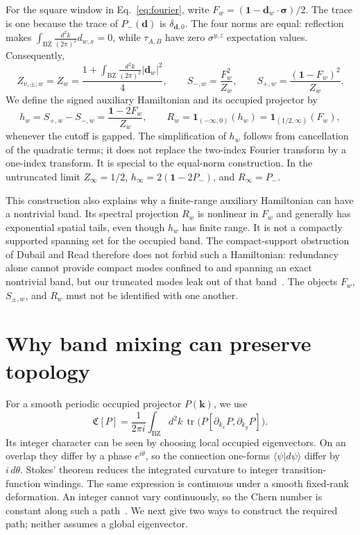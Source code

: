 \documentclass[aps,prb,onecolumn,nofootinbib,superscriptaddress]{revtex4-2}
\newcommand{\id}{\mathbf{1}}
\newcommand{\tr}{\operatorname{tr}}
\newcommand{\Ch}{\mathfrak C}
\newcommand{\bk}{\boldsymbol k}
\newcommand{\bd}{\boldsymbol d}
\newcommand{\intk}{\int_{\mathrm{BZ}}\frac{d^2k}{(2\pi)^2}}
\begin{document}
For the square window in Eq.~\eqref{eq:fourier}, write
$F_w=(\id-\boldsymbol d_w\cdot\boldsymbol\sigma)/2$.
The trace is one because the trace of $P_-(\bd)$ is $\delta_{\bd,0}$.
The four norms are equal: reflection makes $\intk d_{w,x}=0$, while
$\tau_{A,B}$ have zero $\sigma^{y,z}$ expectation values. Consequently,
\begin{equation}
 Z_{\nu,\pm;w}=Z_w=\frac{1+\intk|\boldsymbol d_w|^2}{4},\qquad
 S_{-,w}=\frac{F_w^2}{Z_w},\qquad
 S_{+,w}=\frac{(\id-F_w)^2}{Z_w}.
 \label{eq:symmetric-frame}
\end{equation}
We define the signed auxiliary Hamiltonian and its occupied projector by
\begin{equation}
 h_w=S_{+,w}-S_{-,w}=\frac{\id-2F_w}{Z_w},\qquad
 R_w=\mathbf{1}_{(-\infty,0)}(h_w)=\mathbf{1}_{(1/2,\infty)}(F_w),
 \label{eq:hw}
\end{equation}
whenever the cutoff is gapped. The simplification of $h_w$ follows from
cancellation of the quadratic terms; it does not replace the two-index
Fourier transform by a one-index transform. It is special to the equal-norm
construction. In the untruncated limit $Z_\infty=1/2$, $h_\infty=2(\id-2P_-)$,
and $R_\infty=P_-$.

This construction also explains why a finite-range auxiliary Hamiltonian can
have a nontrivial band. Its spectral projection $R_w$ is nonlinear in $F_w$
and generally has exponential spatial tails, even though $h_w$ has finite
range. It is not a compactly supported spanning set for the occupied band.
The compact-support obstruction of Dubail and Read therefore does not forbid
such a Hamiltonian: redundancy alone cannot provide compact modes confined
to and spanning an exact nontrivial band, but our truncated modes leak out
of that band~\cite{DubailRead2015}. The objects $F_w$, $S_{\pm,w}$, and $R_w$
must not be identified with one another.

\section{Why band mixing can preserve topology}
\label{sec:stability}

For a smooth periodic occupied projector $P(\bk)$, we use
\begin{equation}
 \Ch[P]=\frac{1}{2\pi i}\int_{\mathrm{BZ}}d^2k\,
 \tr\bigl(P[\partial_{k_x}P,\partial_{k_y}P]\bigr).
 \label{eq:chern}
\end{equation}
Its integer character can be seen by choosing local occupied eigenvectors.
On an overlap they differ by a phase $e^{i\theta}$, so the connection
one-forms $\langle\psi|d\psi\rangle$ differ by $i\,d\theta$.
Stokes' theorem reduces the integrated curvature to integer
transition-function windings. The same expression is continuous under a
smooth fixed-rank deformation. An integer cannot vary continuously, so the
Chern number is constant along such a path~\cite{Avron1983}. We next give two
ways to construct the required path; neither assumes a global eigenvector.
\end{document}
